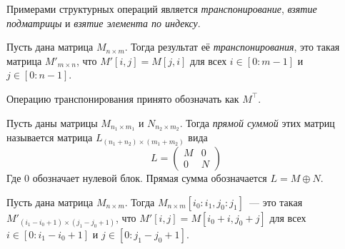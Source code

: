 Примерами структурных операций является \emph{транспонирование}, \emph{взятие подматрицы} и \emph{взятие элемента по индексу}.

\begin{definition}
    Пусть дана матрица $M_{n \times m}$.
    Тогда результат её \emph{транспонирования}, это такая матрица $M'_{m \times n}$, что $M'[i,j] = M[j,i]$ для всех $i \in [0 : m - 1]$ и $j \in [0 : n - 1]$.

    Операцию транспонирования принято обозначать как $M^\top$.
\end{definition}

\begin{definition}
    Пусть даны матрицы $M_{n_1 \times m_1}$ и $N_{n_2 \times m_2}$.
    Тогда \emph{прямой суммой} этих матриц называется матрица $L_{(n_1 + n_2) \times (m_1 + m_2)}$ вида
    \[
        L =
        \begin{pmatrix}
            M & 0 \\
            0 & N
        \end{pmatrix}
    \]
    Где 0 обозначает нулевой блок. Прямая сумма обозначается $L = M \oplus N$.
\end{definition}

\begin{definition}
    Пусть дана матрица $M_{n\times m}$.
    Тогда $M_{n \times m}[i_0 : i_1, j_0 : j_1]$~--- это такая $M'_{(i_1 - i_0 + 1) \times (j_1 - j_0 + 1)}$, что $M'[i, j] = M[i_0 + i, j_0 + j]$ для всех $i \in [0 : i_1 - i_0 + 1]$ и $j \in [0 : j_1 - j_0 + 1]$.
\end{definition}

